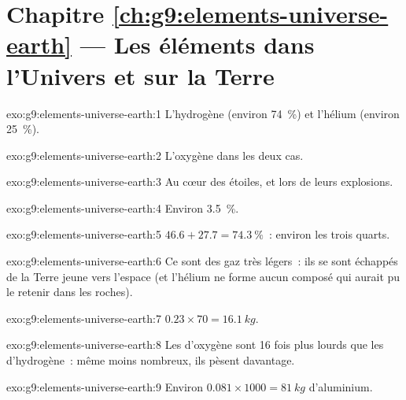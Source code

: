\section*{Chapitre \ref{ch:g9:elements-universe-earth} --- Les éléments dans l'Univers et sur la Terre}

\begin{solution}{exo:g9:elements-universe-earth:1}
L'hydrogène (environ \qty{74}{\percent}) et l'hélium (environ
\qty{25}{\percent}).
\end{solution}

\begin{solution}{exo:g9:elements-universe-earth:2}
L'oxygène dans les deux cas.
\end{solution}

\begin{solution}{exo:g9:elements-universe-earth:3}
Au cœur des étoiles, et lors de leurs explosions.
\end{solution}

\begin{solution}{exo:g9:elements-universe-earth:4}
Environ \qty{3.5}{\percent}.
\end{solution}

\begin{solution}{exo:g9:elements-universe-earth:5}
$46.6 + 27.7 = \qty{74.3}{\percent}$~: environ les trois quarts.
\end{solution}

\begin{solution}{exo:g9:elements-universe-earth:6}
Ce sont des gaz très légers~: ils se sont échappés de la Terre jeune
vers l'espace (et l'hélium ne forme aucun composé qui aurait pu le
retenir dans les roches).
\end{solution}

\begin{solution}{exo:g9:elements-universe-earth:7}
$0.23 \times 70 = \qty{16.1}{kg}$.
\end{solution}

\begin{solution}{exo:g9:elements-universe-earth:8}
Les  d'oxygène sont 16 fois plus lourds que les 
d'hydrogène~: même moins nombreux, ils pèsent davantage.
\end{solution}

\begin{solution}{exo:g9:elements-universe-earth:9}
Environ $0.081 \times 1000 = \qty{81}{kg}$ d'aluminium.
\end{solution}

